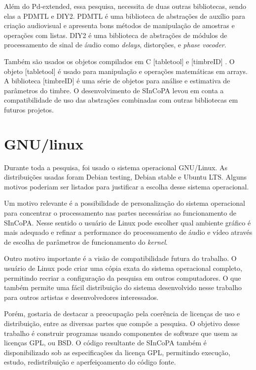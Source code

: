 \documentclass{ppgmus}
\begin{document}
Além do Pd-extended, essa pesquisa, necessita de duas outras bibliotecas, sendo elas a PDMTL e DIY2.
PDMTL é uma biblioteca de abstrações de auxílio para criação audiovisual e apresenta
bons métodos de manipulação de amostras e operações com listas. DIY2 é uma biblioteca de 
abstrações de módulos de processamento de sinal de áudio como \textit{delays}, distorções, e \textit{phase vocoder}.

Também são usados os objetos compilados em C [tabletool] e [timbreID] \cite{brent}. 
O objeto [tabletool] é usado para manipulação e operações matemáticas em arrays.
 A biblioteca [timbreID] é uma série de objetos para análise e estimativa de parâmetros do timbre.
O desenvolvimento de SInCoPA levou em conta a compatibilidade de uso das abstrações combinadas
com outras bibliotecas em futuros projetos.


\section{GNU/linux}

Durante toda a pesquisa, foi usado o sistema operacional GNU/Linux.
As distribuições usadas foram Debian testing, Debian stable e Ubuntu LTS.
Alguns motivos poderiam ser listados para justificar a escolha desse sistema
operacional. 

Um motivo relevante é a possibilidade de personalização do sistema operacional para concentrar o 
processamento nas partes necessárias
ao funcionamento de SInCoPA. Nesse sentido o usuário de Linux pode escolher qual ambiente gráfico
é mais adequado e refinar a performance do processamento de áudio e vídeo através de escolha de parâmetros de funcionamento
do \textit{kernel}.

Outro motivo importante é a visão de compatibilidade futura do trabalho. 
O usuário de Linux pode criar uma cópia exata do sistema operacional completo, permitindo
recriar a configuração da pesquisa em outros computadores. O que também
permite uma fácil distribuição do sistema desenvolvido nesse trabalho
para outros artistas e desenvolvedores interessados.


Porém, gostaria de destacar a preocupação pela coerência de licenças
de uso e distribuição, entre as diversas partes que compõe a pesquisa.
O objetivo desse trabalho é construir programas usando componentes de software que usem as licenças GPL, ou 
BSD. O código resultante de SInCoPA também é disponibilizado sob as especificações
da licença GPL, permitindo execução, estudo, redistribuição e aperfeiçoamento do código fonte.
\end{document}
